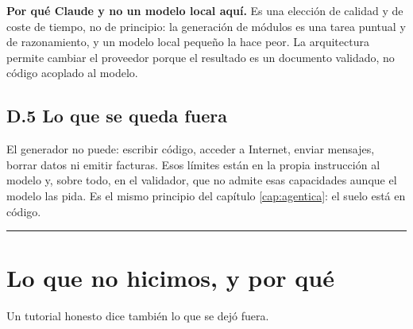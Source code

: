 \textbf{Por qué Claude y no un modelo local aquí.} Es una elección de calidad y de coste de tiempo, no de principio: la generación de módulos es una tarea puntual y de razonamiento, y un modelo local pequeño la hace peor. La arquitectura permite cambiar el proveedor porque el resultado es un documento validado, no código acoplado al modelo.

\section{D.5 Lo que se queda fuera}\label{d.5-lo-que-se-queda-fuera}

El generador no puede: escribir código, acceder a Internet, enviar mensajes, borrar datos ni emitir facturas. Esos límites están en la propia instrucción al modelo y, sobre todo, en el validador, que no admite esas capacidades aunque el modelo las pida. Es el mismo principio del capítulo \ref{cap:agentica}: el suelo está en código.

\begin{center}\rule{0.5\linewidth}{0.5pt}\end{center}

\chapter{Lo que no hicimos, y por qué}\label{lo-que-no-hicimos-y-por-quuxe9}

Un tutorial honesto dice también lo que se dejó fuera.

